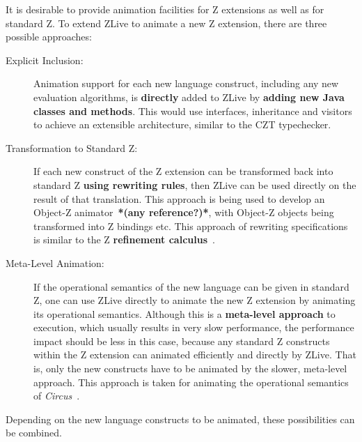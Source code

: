 \documentclass{llncs}
\newcommand{\Circus}{{\sf\slshape Circus}}
\begin{document}
    It is desirable to provide animation facilities for Z extensions
    as well as for standard Z.  To extend ZLive to animate a new Z
    extension, there are three possible approaches:
    \begin{description}

      \item[Explicit Inclusion:] Animation support for each new
      language construct, including any new evaluation algorithms, is
      \textbf{directly} added to ZLive by \textbf{adding new Java
      classes and methods}.  This would use interfaces, inheritance
      and visitors to achieve an extensible architecture, similar to
      the CZT typechecker.

      \item[Transformation to Standard Z:] If each new construct of
      the Z extension can be transformed back into standard Z
      \textbf{using rewriting rules}, then ZLive can be used directly
      on the result of that translation.
      This approach is being used to develop an Object-Z
      animator~\textbf{*(any reference?)*}, with Object-Z objects being
      transformed into Z bindings etc.  This approach of
      rewriting specifications is similar to the Z \textbf{refinement
      calculus}~\cite{z.others:ana.phd,fm.ref:morgan}.

      \item[Meta-Level Animation:] If the operational semantics of
      the new language can be given in standard Z, one can use ZLive
      directly to animate the new Z extension by animating its
      operational semantics.  Although this is a \textbf{meta-level
      approach} to execution, which usually results in very slow
      performance, the performance impact should be less in this case,
      because any standard Z constructs within the Z extension can
      animated efficiently and directly by ZLive.  That is, only the
      new constructs have to be animated by the slower, meta-level
      approach.  This approach is taken for animating the operational
      semantics of \Circus~\cite{circus.mc:opsem}.

    \end{description}

    Depending on the new language constructs to be animated, these 
    possibilities can be combined.
\end{document}
